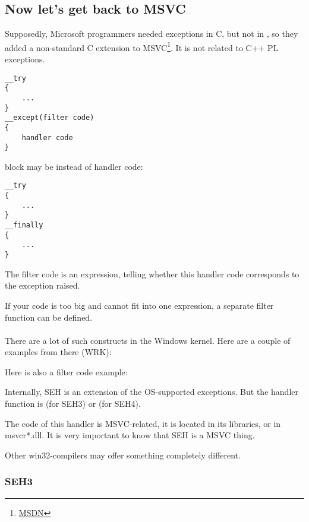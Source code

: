 \subsection{Now let's get back to MSVC}


Supposedly, Microsoft programmers needed exceptions in C, but not in \Cpp, so they added a non-standard C extension
to MSVC\footnote{\href{http://go.yurichev.com/17057}{MSDN}}.
It is not related to C++ \ac{PL} exceptions.

\begin{lstlisting}
__try
{
    ...
}
__except(filter code)
{
    handler code
}
\end{lstlisting}

 block may be instead of handler code:

\begin{lstlisting}
__try
{
    ...
}
__finally
{
    ...
}
\end{lstlisting}


The filter code is an expression, telling whether this handler code corresponds to the exception raised.

If your code is too big and cannot fit into one expression, a separate filter function can be defined.\\
\\
There are a lot of such constructs in the Windows kernel.
Here are a couple of examples from there (\ac{WRK}):





Here is also a filter code example:



Internally, SEH is an extension of the OS-supported exceptions.
But the handler function is  (for SEH3) or  (for SEH4).

The code of this handler is MSVC-related, it is located in its libraries, or in msvcr*.dll.
It is very important to know that SEH is a MSVC thing.

Other win32-compilers may offer something completely different.

\subsubsection{SEH3}

